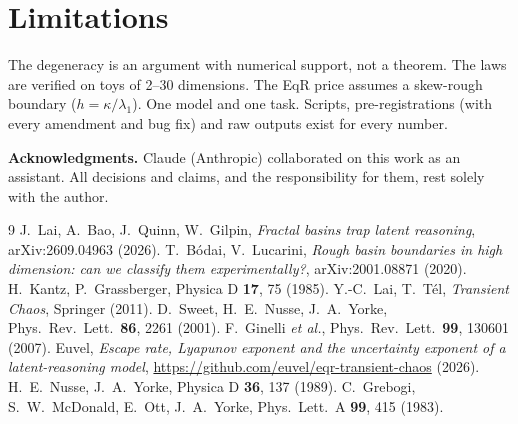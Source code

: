 \documentclass[10pt,twocolumn]{article}
\begin{document}
\section{Limitations}
The degeneracy is an argument with numerical support, not a theorem. The laws are verified on toys of 2--30
dimensions. The EqR price assumes a skew-rough boundary ($h=\kappa/\lambda_1$). One model and one task. Scripts,
pre-registrations (with every amendment and bug fix) and raw outputs exist for every number.

\small
\noindent\textbf{Acknowledgments.} Claude (Anthropic) collaborated on this work as an assistant. All decisions and
claims, and the responsibility for them, rest solely with the author.

\footnotesize
\begin{thebibliography}{9}\setlength{\itemsep}{0pt}
 J.~Lai, A.~Bao, J.~Quinn, W.~Gilpin, \emph{Fractal basins trap latent reasoning}, arXiv:2609.04963 (2026).
 T.~B\'odai, V.~Lucarini, \emph{Rough basin boundaries in high dimension: can we classify them experimentally?}, arXiv:2001.08871 (2020).
 H.~Kantz, P.~Grassberger, Physica D \textbf{17}, 75 (1985).
 Y.-C.~Lai, T.~T\'el, \emph{Transient Chaos}, Springer (2011).
 D.~Sweet, H.~E.~Nusse, J.~A.~Yorke, Phys.\ Rev.\ Lett.\ \textbf{86}, 2261 (2001).
 F.~Ginelli \emph{et al.}, Phys.\ Rev.\ Lett.\ \textbf{99}, 130601 (2007).
 Euvel, \emph{Escape rate, Lyapunov exponent and the uncertainty exponent of a latent-reasoning model}, \url{https://github.com/euvel/eqr-transient-chaos} (2026).
 H.~E.~Nusse, J.~A.~Yorke, Physica D \textbf{36}, 137 (1989).
 C.~Grebogi, S.~W.~McDonald, E.~Ott, J.~A.~Yorke, Phys.\ Lett.\ A \textbf{99}, 415 (1983).
\end{thebibliography}
\end{document}
